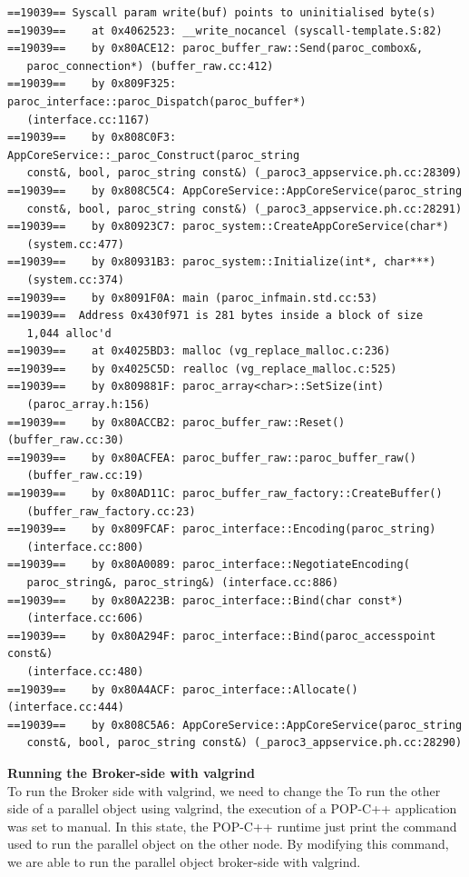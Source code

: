 \begin{lstlisting}
==19039== Syscall param write(buf) points to uninitialised byte(s)
==19039==    at 0x4062523: __write_nocancel (syscall-template.S:82)
==19039==    by 0x80ACE12: paroc_buffer_raw::Send(paroc_combox&, 
   paroc_connection*) (buffer_raw.cc:412)
==19039==    by 0x809F325: paroc_interface::paroc_Dispatch(paroc_buffer*) 
   (interface.cc:1167)
==19039==    by 0x808C0F3: AppCoreService::_paroc_Construct(paroc_string 
   const&, bool, paroc_string const&) (_paroc3_appservice.ph.cc:28309)
==19039==    by 0x808C5C4: AppCoreService::AppCoreService(paroc_string 
   const&, bool, paroc_string const&) (_paroc3_appservice.ph.cc:28291)
==19039==    by 0x80923C7: paroc_system::CreateAppCoreService(char*) 
   (system.cc:477)
==19039==    by 0x80931B3: paroc_system::Initialize(int*, char***) 
   (system.cc:374)
==19039==    by 0x8091F0A: main (paroc_infmain.std.cc:53)
==19039==  Address 0x430f971 is 281 bytes inside a block of size 
   1,044 alloc'd
==19039==    at 0x4025BD3: malloc (vg_replace_malloc.c:236)
==19039==    by 0x4025C5D: realloc (vg_replace_malloc.c:525)
==19039==    by 0x809881F: paroc_array<char>::SetSize(int) 
   (paroc_array.h:156)
==19039==    by 0x80ACCB2: paroc_buffer_raw::Reset() (buffer_raw.cc:30)
==19039==    by 0x80ACFEA: paroc_buffer_raw::paroc_buffer_raw() 
   (buffer_raw.cc:19)
==19039==    by 0x80AD11C: paroc_buffer_raw_factory::CreateBuffer() 
   (buffer_raw_factory.cc:23)
==19039==    by 0x809FCAF: paroc_interface::Encoding(paroc_string) 
   (interface.cc:800)
==19039==    by 0x80A0089: paroc_interface::NegotiateEncoding(
   paroc_string&, paroc_string&) (interface.cc:886)
==19039==    by 0x80A223B: paroc_interface::Bind(char const*) 
   (interface.cc:606)
==19039==    by 0x80A294F: paroc_interface::Bind(paroc_accesspoint const&) 
   (interface.cc:480)
==19039==    by 0x80A4ACF: paroc_interface::Allocate() (interface.cc:444)
==19039==    by 0x808C5A6: AppCoreService::AppCoreService(paroc_string 
   const&, bool, paroc_string const&) (_paroc3_appservice.ph.cc:28290)
\end{lstlisting}



\textbf{Running the Broker-side with valgrind}\\
To run the Broker side with valgrind, we need to change the 
To run the other side of a parallel object using valgrind, the execution of a POP-C++ application was set to manual. In this state, the POP-C++ runtime just print the command used to run the parallel object on the other node. By modifying this command, we are able to run the parallel object broker-side with valgrind. \s

